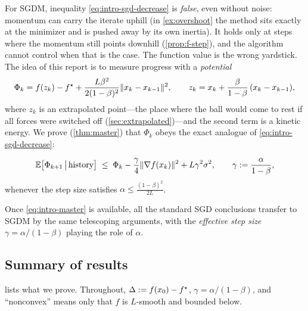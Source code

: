 For SGDM, inequality \eqref{eq:intro-sgd-decrease} is \emph{false}, even without noise:
momentum can carry the iterate uphill (in \cref{ex:overshoot} the method sits exactly at
the minimizer and is pushed away by its own inertia). It holds only at steps where the
momentum still points downhill (\cref{prop:f-step}), and the algorithm cannot control
when that is the case. The function value is the wrong yardstick. The idea of this report is to measure progress with a \emph{potential}
\[
  \Phi_k=f(z_k)-f^\star+\frac{L\beta^2}{2(1-\beta)^2}\lVert x_k-x_{k-1}\rVert^2,
  \qquad z_k=x_k+\frac{\beta}{1-\beta}\,(x_k-x_{k-1}),
\]
where $z_k$ is an extrapolated point---the place where the ball would come to rest if all
forces were switched off (\cref{sec:extrapolated})---and the second term is a kinetic
energy. We prove (\cref{thm:master}) that $\Phi_k$ obeys the exact analogue of
\eqref{eq:intro-sgd-decrease}:
\begin{tcolorbox}[keybox]
\begin{equation}\label{eq:intro-master}
  \mathbb{E}\bigl[\Phi_{k+1}\,\big|\,\text{history}\bigr]\;\le\;\Phi_k
  -\frac{\gamma}{4}\lVert \nabla f(x_k)\rVert^2+L\gamma^2\sigma^2,
  \qquad \gamma:=\frac{\alpha}{1-\beta},
\end{equation}
\centering whenever the step size satisfies $\displaystyle\alpha\le\frac{(1-\beta)^2}{2L}$.
\end{tcolorbox}
\noindent Once \eqref{eq:intro-master} is available, all the standard SGD conclusions
transfer to SGDM by the same telescoping arguments, with the \emph{effective step size}
$\gamma=\alpha/(1-\beta)$ playing the role of $\alpha$.

\subsection{Summary of results}

 lists what we prove. Throughout, $\Delta:=f(x_0)-f^\star$, $\gamma=\alpha/(1-\beta)$,
and ``nonconvex'' means only that $f$ is $L$-smooth and bounded below.

